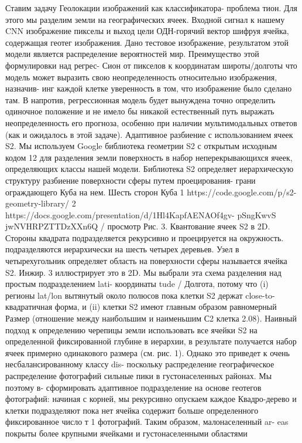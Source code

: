 Ставим задачу Геолокации изображений как классификатора-
проблема тион. Для этого мы разделим земли на
географических ячеек. Входной сигнал к нашему CNN изображение
пикселы и выход цели ОДН-горячий вектор шифруя
ячейка, содержащая геотег изображения. Дано тестовое изображение,
результатом этой модели является распределение вероятностей
мир. Преимущество этой формулировки над регрес-
Сион от пикселов к координатам широты/долготы что
модель может выразить свою неопределенность относительно изображения, назначив-
инг каждой клетке уверенность в том, что изображение было сделано там. В
напротив, регрессионная модель будет вынуждена точно определить
одиночное положение и не имело бы никакой естественный путь выражать
неопределенность его прогноза, особенно при наличии
мультимодальных ответов (как и ожидалось в этой задаче).
Адаптивное разбиение с использованием ячеек S2. Мы используем Google
библиотека геометрии S2 с открытым исходным кодом 12 для разделения земли
поверхность в набор неперекрывающихся ячеек, определяющих
классы нашей модели. Библиотека S2 определяет иерархическую структуру
разбиение поверхности сферы путем проецирования-
грани ограждающего Куба на нем. Шесть сторон Куба
1 https://code.google.com/p/s2-geometry-library/
2 https://docs.google.com/presentation/d/1Hl4KapfAENAOf4gv-
pSngKwvS jwNVHRPZTTDzXXn6Q / просмотр
Рис. 3. Квантование ячеек S2 в 2D. Стороны квадрата
подразделяется рекурсивно и проецируется на окружность.
подразделяются иерархически на шесть четырех деревьев. Узел в
четырехугольник определяет область на поверхности сферы
называется ячейка S2. Инжир. 3 иллюстрирует это в 2D. Мы выбрали
эта схема разделения над простым подразделением lati-
координаты tude / Долгота, потому что (i) регионы lat/lon
вытянутый около полюсов пока клетки S2 держат close-to-
квадратичная форма, и (ii) клетки S2 имеют главным образом равномерный Размер
(отношение между наибольшим и наименьшим С2 клетка 2.08).
Наивный подход к определению черепицы земли
использовать все ячейки S2 на определенной фиксированной глубине в иерархии,
в результате получается набор ячеек примерно одинакового размера (см. рис. 1).
Однако это приведет к очень несбалансированному классу dis-
поскольку распределение географическое распределение фотографий
сильные пики в густонаселенных районах. Мы поэтому в-
сформировать адаптивное подразделение на основе геотегов фотографий:
начиная с корней, мы рекурсивно опускаем каждое Квадро-дерево
и клетки подразделяют пока нет ячейка содержит больше определенного
фиксированное число т 1 фотографий. Таким образом, малонаселенный ar-
eas покрыты более крупными ячейками и густонаселенными областями
